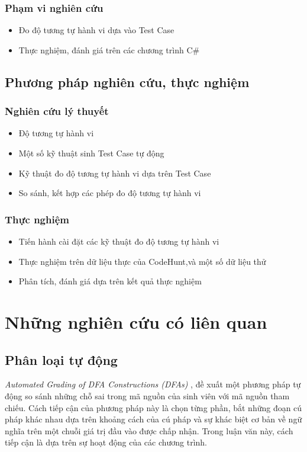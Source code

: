 \subsubsection*{Phạm vi nghiên cứu}
\begin{itemize}
\item Đo độ tương tự hành vi dựa vào Test Case
\item Thực nghiệm, đánh giá trên các chương trình C\#
\end{itemize}


\subsection*{Phương pháp nghiên cứu, thực nghiệm}
\subsubsection*{Nghiên cứu lý thuyết}
\begin{itemize}
\item Độ tương tự hành vi
\item Một số kỹ thuật sinh Test Case tự động
\item Kỹ thuật đo độ tương tự hành vi dựa trên Test Case
\item So sánh, kết hợp các phép đo độ tương tự hành vi
\end{itemize}
		
\subsubsection*{Thực nghiệm}
\begin{itemize}
\item Tiến hành cài đặt các kỹ thuật đo độ tương tự hành vi
\item Thực nghiệm trên dữ liệu thực của CodeHunt,và một số dữ liệu thử
\item Phân tích, đánh giá dựa trên kết quả thực nghiệm
\end{itemize}


\section{Những nghiên cứu có liên quan}

\subsection*{Phân loại tự động}
	
\textit{Automated Grading of DFA Constructions (DFAs)}
\cite{alur2013automated}, đề xuất một phương pháp tự động so sánh
những chỗ sai trong mã nguồn của sinh viên với mã nguồn tham
chiếu. Cách tiếp cận của phương pháp này là chọn từng phần, bắt những
đoạn cú pháp khác nhau dựa trên khoảng cách của cú pháp và sự khác
biệt cơ bản về ngữ nghĩa trên một chuỗi giá trị đầu vào được chấp
nhận. Trong luận văn này, cách tiếp cận là dựa trên sự hoạt động của
các chương trình.
	
